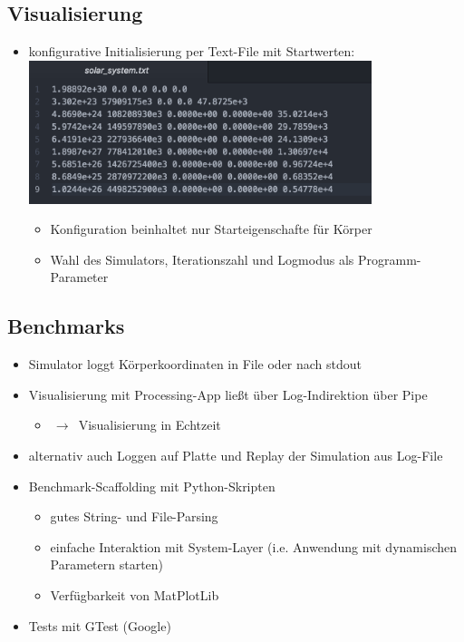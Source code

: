 \documentclass{beamer}
\begin{document}
\subsection{Visualisierung}
\begin{frame}
\begin{itemize}
  \item konfigurative Initialisierung per Text-File mit Startwerten:
  \includegraphics[width=10cm]{img/config_solar.png}
  \begin{itemize}
    \item Konfiguration beinhaltet nur Starteigenschafte für Körper
    \item Wahl des Simulators, Iterationszahl und Logmodus als Programm-Parameter
  \end{itemize}
\end{itemize}
\end{frame}

\subsection{Benchmarks}
\begin{frame}
\begin{itemize}
  \item Simulator loggt Körperkoordinaten in File oder nach stdout
  \item Visualisierung mit Processing-App ließt über Log-Indirektion über Pipe
  \begin{itemize}
    \item $\,\to\,$ Visualisierung in Echtzeit
  \end{itemize}
  \item alternativ auch Loggen auf Platte und Replay der Simulation aus Log-File
  \item Benchmark-Scaffolding mit Python-Skripten
  \begin{itemize}
    \item gutes String- und File-Parsing
    \item einfache Interaktion mit System-Layer (i.e. Anwendung mit dynamischen Parametern starten)
    \item Verfügbarkeit von MatPlotLib
  \end{itemize}
  \item Tests mit GTest (Google)
\end{itemize}
\end{frame}
\end{document}
